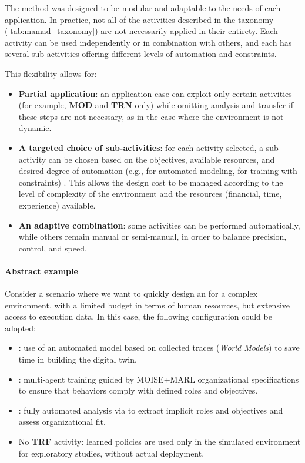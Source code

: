 

The  method was designed to be modular and adaptable to the needs of each application.
In practice, not all of the activities described in the taxonomy (\autoref{tab:mamad_taxonomy}) are not necessarily applied in their entirety.
Each activity can be used independently or in combination with others, and each has several sub-activities offering different levels of automation and constraints.

This flexibility allows for:
\begin{itemize}
  \item \textbf{Partial application}: an application case can exploit only certain activities (for example, \textbf{MOD} and \textbf{TRN} only) while omitting analysis and transfer if these steps are not necessary, as in the case where the environment is not dynamic.
  \item \textbf{A targeted choice of sub-activities}: for each activity selected, a sub-activity can be chosen based on the objectives, available resources, and desired degree of automation (e.g.,  for automated modeling,  for training with constraints) . This allows the design cost to be managed according to the level of complexity of the environment and the resources (financial, time, experience) available.
  \item \textbf{An adaptive combination}: some activities can be performed automatically, while others remain manual or semi-manual, in order to balance precision, control, and speed.
\end{itemize}

\paragraph{Abstract example}
Consider a scenario where we want to quickly design an  for a complex environment, with a limited budget in terms of human resources, but extensive access to execution data.
In this case, the following configuration could be adopted:
\begin{itemize}
  \item {}: use of an automated model based on collected traces (\textit{World Models}) to save time in building the digital twin.
  \item {}: multi-agent training guided by MOISE+MARL organizational specifications to ensure that behaviors comply with defined roles and objectives.
  \item {}: fully automated analysis via  to extract implicit roles and objectives and assess organizational fit.
  \item No \textbf{TRF} activity: learned policies are used only in the simulated environment for exploratory studies, without actual deployment.
\end{itemize}

